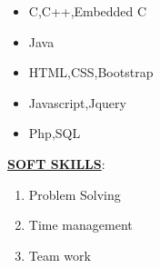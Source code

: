 \documentclass[a4paper,12pt]{article}
\begin{document}
\begin{flushleft}
\begin{itemize}
 \item{C,C++,Embedded C}
 \item{Java}
 \item{HTML,CSS,Bootstrap}
 \item{Javascript,Jquery}
 \item{Php,SQL}
 
\end{itemize}
\underline{\textbf{SOFT SKILLS}}:\\[0.5cm]
\begin{enumerate}
 \item{Problem Solving}
 \item{Time management}
 \item{Team work}
\end{enumerate}
 \end{flushleft}
\end{document}
